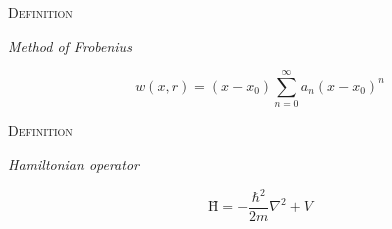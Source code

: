 \documentclass{article}
\newenvironment{flashcard}[2][]{%
\noindent  \textsc{#1}

\vfill
\centerline{{\Large\emph{#2}}}
\vfill
\newpage
}
{\newpage}
\begin{document}







\begin{flashcard}[Definition]{Method of Frobenius}

\begin{displaymath}
w(x,r)=(x-x_{0})\sum_{n=0}^{\infty}a_{n}(x-x_{0})^{n}
\end{displaymath}
\end{flashcard}

\begin{flashcard}[Definition]{Hamiltonian operator}
\begin{displaymath}
\textrm{\^H} = -\frac{\hbar^2}{2m}\nabla^2 + V
\end{displaymath}
\end{flashcard}
\end{document}
